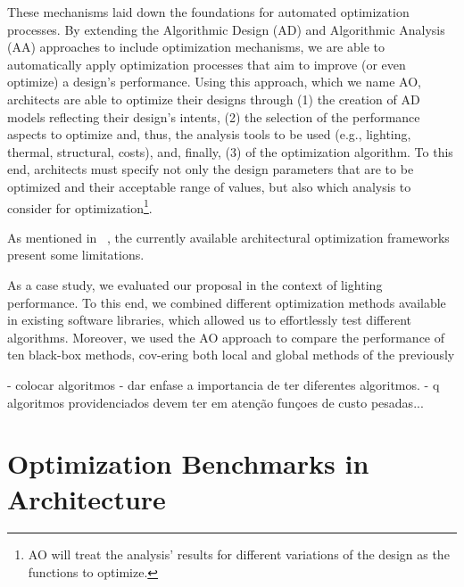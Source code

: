 These mechanisms laid down the foundations for automated optimization processes. By extending the Algorithmic Design (AD) and Algorithmic Analysis (AA) approaches to include optimization mechanisms, we are able to automatically apply optimization processes that aim to improve (or even optimize) a design’s performance. Using this approach, which we name \ac{AO}, architects are able to optimize their designs through (1) the creation of \ac{AD} models reflecting their design's intents, (2) the selection of the performance aspects to optimize and, thus, the analysis tools to be used (e.g., lighting, thermal, structural, costs), and, finally, (3) of the optimization algorithm. To this end, architects must specify not only the design parameters that are to be optimized and their acceptable range of values, but also which analysis to consider for optimization\footnote{\ac{AO} will treat the analysis' results for different variations of the design as the functions to optimize.}. 




As mentioned in ~, the currently available architectural optimization frameworks present some limitations.

As a case study, we evaluated our proposal in the context of lighting performance. To this end, we combined different optimization methods available in existing software libraries, which allowed us to effortlessly test different algorithms. Moreover, we used the AO approach to compare the performance of ten black-box methods, cov-ering both local and global methods of the previously



- colocar algoritmos
- dar enfase a importancia de ter diferentes algoritmos.
- q algoritmos providenciados devem ter em atenção funçoes de custo pesadas...


\section{Optimization Benchmarks in Architecture}

